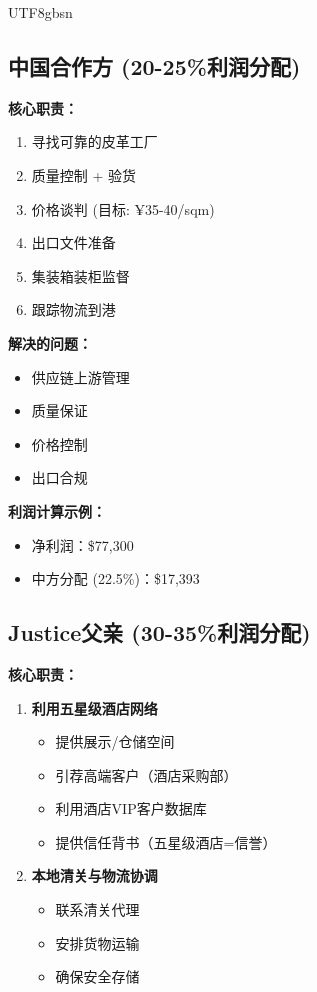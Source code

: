 \documentclass[12pt,a4paper]{article}
\begin{document}
\begin{CJK}{UTF8}{gbsn}

\subsection{中国合作方 (20-25\%利润分配)}

\textbf{核心职责：}
\begin{enumerate}
    \item 寻找可靠的皮革工厂
    \item 质量控制 + 验货
    \item 价格谈判 (目标: ¥35-40/sqm)
    \item 出口文件准备
    \item 集装箱装柜监督
    \item 跟踪物流到港
\end{enumerate}

\textbf{解决的问题：}
\begin{itemize}
    \item 供应链上游管理
    \item 质量保证
    \item 价格控制
    \item 出口合规
\end{itemize}

\textbf{利润计算示例：}
\begin{itemize}
    \item 净利润：\$77,300
    \item 中方分配 (22.5\%)：\$17,393
\end{itemize}

\subsection{Justice父亲 (30-35\%利润分配)}

\textbf{核心职责：}
\begin{enumerate}
    \item \textbf{利用五星级酒店网络}
    \begin{itemize}
        \item 提供展示/仓储空间
        \item 引荐高端客户（酒店采购部）
        \item 利用酒店VIP客户数据库
        \item 提供信任背书（五星级酒店=信誉）
    \end{itemize}
    
    \item \textbf{本地清关与物流协调}
    \begin{itemize}
        \item 联系清关代理
        \item 安排货物运输
        \item 确保安全存储
    \end{itemize}
    

\end{enumerate}
\end{CJK}
\end{document}
